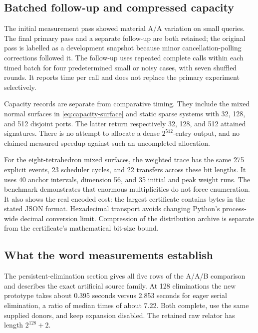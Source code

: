 \documentclass[11pt,a4paper]{article}
\theoremstyle{definition}
\theoremstyle{remark}
\begin{document}
\subsection{Batched follow-up and compressed capacity}

The initial measurement pass showed material A/A variation on small
queries. The final primary pass and a separate follow-up are both retained;
the original pass is labelled as a development snapshot because minor
cancellation-polling corrections followed it. The follow-up uses repeated
complete calls within each timed batch for four predetermined small or
noisy cases, with seven shuffled rounds. It reports time per call and
does not replace the primary experiment selectively.



Capacity records are separate from comparative timing. They include
the mixed normal surfaces in \eqref{eq:capacity-surface} and static sparse
systems with 32, 128, and 512 disjoint ports. The latter return respectively
32, 128, and 512 attained signatures. There is no attempt to allocate a
dense $2^{512}$-entry output, and no claimed measured speedup against such
an uncompleted allocation.



For the eight-tetrahedron mixed surfaces, the weighted trace has the same
275 explicit events, 23 scheduler cycles, and 22 transfers across these
bit lengths. It uses 40 anchor intervals, dimension 56, and 35 initial
and peak weight runs. The benchmark demonstrates that enormous
multiplicities do not force enumeration. It also shows the real encoded
cost: the largest certificate contains \LargestCertificateBytes{} bytes
in the stated JSON format. Hexadecimal transport avoids changing Python's
process-wide decimal conversion limit. Compression of the distribution
archive is separate from the certificate's mathematical bit-size bound.

\subsection{What the word measurements establish}

The persistent-elimination section gives all five rows of the A/A/B
comparison and describes the exact artificial source family. At 128
eliminations the new prototype takes about 0.395 seconds versus 2.853
seconds for eager serial elimination, a ratio of median times of about
7.22. Both complete, use the same supplied donors, and keep expansion
disabled. The retained raw relator has length $2^{128}+2$.
\end{document}
